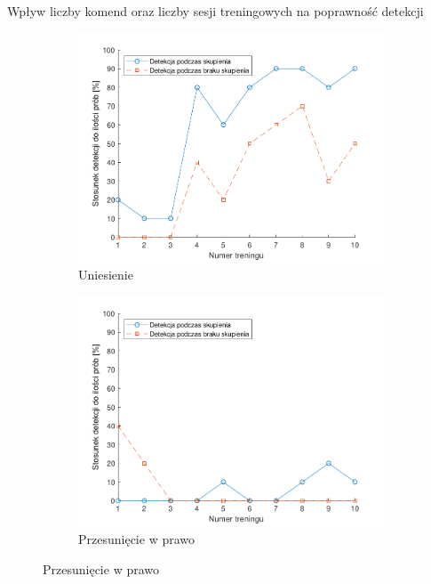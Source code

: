 \documentclass[10pt,aspectratio=169]{beamer}
\begin{document}
\begin{frame}{Wpływ liczby komend oraz liczby sesji treningowych na poprawność detekcji}
  \begin{figure}[htb]
    \centering
    \begin{subfigure}{0.3\linewidth}
    \includegraphics[width=\linewidth,keepaspectratio]{obrazy/up}
    \caption{Uniesienie}
    \end{subfigure}\hspace*{\fill}
    \begin{subfigure}{0.3\linewidth}
    \includegraphics[width=\linewidth,keepaspectratio]{obrazy/right}
    \caption{Przesunięcie w prawo}
    \end{subfigure}\hspace*{\fill}

\end{figure}
\end{frame}
\end{document}
